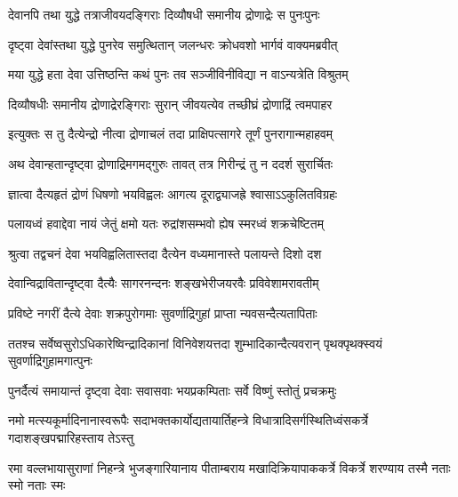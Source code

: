 \twolineshloka
{देवानपि तथा युद्धे तत्राजीवयदङ्गिराः}
{दिव्यौषधी समानीय द्रोणाद्रेः स पुनःपुनः} %

\twolineshloka
{दृष्ट्वा देवांस्तथा युद्धे पुनरेव समुत्थितान्}
{जलन्धरः क्रोधवशो भार्गवं वाक्यमब्रवीत्} %


\twolineshloka
{मया युद्धे हता देवा उत्तिष्ठन्ति कथं पुनः}
{तव सञ्जीविनीविद्या न वाऽन्यत्रेति विश्रुतम्} %


\twolineshloka
{दिव्यौषधीः समानीय द्रोणाद्रेरङ्गिराः सुरान्}
{जीवयत्येव तच्छीघ्रं द्रोणाद्रिं त्वमपाहर} %


\twolineshloka
{इत्युक्तः स तु दैत्येन्द्रो नीत्वा द्रोणाचलं तदा}
{प्राक्षिपत्सागरे तूर्णं पुनरागान्महाहवम्} %

\twolineshloka
{अथ देवान्हतान्दृष्ट्वा द्रोणाद्रिमगमद्गुरुः}
{तावत् तत्र गिरीन्द्रं तु न ददर्श सुरार्चितः} %

\twolineshloka
{ज्ञात्वा दैत्यहृतं द्रोणं धिषणो भयविह्वलः}
{आगत्य दूराद्व्याजह्रे श्वासाऽऽकुलितविग्रहः} %

\twolineshloka
{पलायध्वं हवाद्देवा नायं जेतुं क्षमो यतः}
{रुद्रांशसम्भवो ह्येष स्मरध्वं शक्रचेष्टितम्} %

\twolineshloka
{श्रुत्वा तद्वचनं देवा भयविह्वलितास्तदा}
{दैत्येन वध्यमानास्ते पलायन्ते दिशो दश} %

\twolineshloka
{देवान्विद्रावितान्दृष्ट्वा दैत्यैः सागरनन्दनः}
{शङ्खभेरीजयरवैः प्रविवेशामरावतीम्} %

\twolineshloka
{प्रविष्टे नगरीं दैत्ये देवाः शक्रपुरोगमाः}
{सुवर्णाद्रिगुहां प्राप्ता न्यवसन्दैत्यतापिताः} %

\twolineshloka
{ततश्च सर्वेष्वसुरोऽधिकारेष्विन्द्रादिकानां विनिवेशयत्तदा}
{शुम्भादिकान्दैत्यवरान् पृथक्पृथक्स्वयं सुवर्णाद्रिगुहामगात्पुनः} %





\twolineshloka
{पुनर्दैत्यं समायान्तं दृष्ट्वा देवाः सवासवाः}
{भयप्रकम्पिताः सर्वे विष्णुं स्तोतुं प्रचक्रमुः} %

\uvacha{[देवा ऊचुः]}

\fourlineindentedshloka
{नमो मत्स्यकूर्मादिनानास्वरूपैः}
{सदाभक्तकार्योद्यतायार्तिहन्त्रे}
{विधात्रादिसर्गस्थितिध्वंसकर्त्रे}
{गदाशङ्खपद्मारिहस्ताय तेऽस्तु} %

\fourlineindentedshloka
{रमा वल्लभायासुराणां निहन्त्रे}
{भुजङ्गारियानाय पीताम्बराय}
{मखादिक्रियापाककर्त्रे विकर्त्रे}
{शरण्याय तस्मै नताः स्मो नताः स्मः} %

